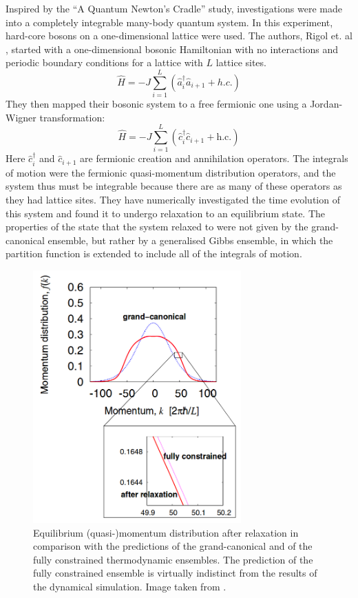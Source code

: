 \documentclass[a4paper, 10pt]{article}
\theoremstyle{plain}
\begin{document}
Inspired by the ``A Quantum Newton's Cradle'' study, investigations were made
into a completely integrable many-body quantum system. In this experiment,
hard-core bosons on a one-dimensional lattice were used. The authors, Rigol et.
al \cite{Rigol2007}, started with a one-dimensional bosonic Hamiltonian with no
interactions and periodic boundary conditions for a lattice with $L$ lattice
sites.
\begin{equation}
 \hat{H}=-J\sum_{i=1}^{L} (\hat{a}_{i}^{\dagger}\hat{a}_{i+1}+h.c.)
\end{equation}
They then mapped their bosonic system to a free fermionic one using a
Jordan-Wigner transformation:
\begin{equation}
    \hat{H}
    =
    -J \sum_{i=1}^{L}{(\hat{c}_{i}^{\dagger}\hat{c}_{i+1} + \text{h.c.})}
\end{equation}
Here $\hat{c}_{i}^{\dagger}$ and $\hat{c}_{i+1}$ are fermionic creation and
annihilation operators. The integrals of motion were the fermionic
quasi-momentum distribution operators, and the system thus must be
integrable because there are as many of these operators as they had lattice
sites. They have numerically investigated the time evolution of this system and
found it to undergo relaxation to an equilibrium state. The properties of the
state that the system relaxed to were not given by the grand-canonical
ensemble, but rather by a generalised Gibbs ensemble, in which the partition
function is extended to include all of the integrals of motion.
\begin{figure}[H]
    \begin{center}
        \includegraphics[width=8cm]{grand_canonical_vs_GGE}
    \end{center}
    \caption{Equilibrium (quasi-)momentum distribution after relaxation in
             comparison with the predictions of the grand-canonical and of the
             fully constrained thermodynamic ensembles. The prediction of the
             fully constrained  ensemble is virtually indistinct from the
             results of the dynamical simulation. Image taken from
             \cite{Rigol2007}.}
\end{figure}
\end{document}

